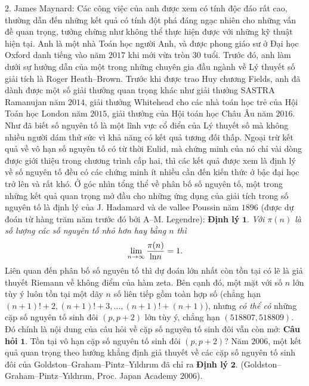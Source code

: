 \begin{multicols}{2}
	\vskip 0.1cm
	$2.$ James Maynard: Các công việc của anh được xem có tính độc đáo rất cao, thường dẫn đến những kết quả có tính đột phá đáng ngạc nhiên cho những vấn đề quan trọng, tưởng chừng như không thể thực hiện được với những kỹ thuật hiện tại.  
	\vskip 0.1cm
	Anh là một nhà Toán học người Anh, và được phong giáo sư ở Đại học Oxford danh tiếng vào năm $2017$ khi mới vừa tròn $30$ tuổi. Trước đó, anh làm dưới sự hướng dẫn của một trong những chuyên gia đầu ngành về Lý thuyết số giải tích là Roger Heath--Brown. Trước khi được trao Huy chương Fields, anh đã dành được một số giải thưởng quan trọng khác như giải thưởng SASTRA Ramanujan năm $2014$, giải thưởng Whitehead cho các nhà toán học trẻ của Hội Toán học London năm $2015$, giải thưởng của Hội toán học Châu Âu năm $2016$.    
	\vskip 0.1cm
	Như đã biết số nguyên tố là một lĩnh vực cổ điển của Lý thuyết số mà không nhiều người dám thử sức vì khả năng có kết quả tương đối thấp. Ngoại trừ kết quả về vô hạn số nguyên tố có từ thời Eulid, mà chứng minh của nó chỉ vài dòng được giới thiệu trong chương trình cấp hai, thì các kết quả được xem là định lý về số nguyên tố đều có các chứng minh ít nhiều cần đến kiến thức ở bậc đại học trở lên và rất khó. Ở góc nhìn tổng thể về phân bố số nguyên tố, một trong những kết quả quan trọng mở đầu cho những ứng dụng của giải tích trong số nguyên tố là định lý của J. Hadamard và de vallee Poussin năm $1896$ (được dự đoán từ hàng trăm năm trước đó bởi A--M. Legendre):
	\vskip 0.1cm
	\textbf{\color{duongvaotoanhoc}Định lý} $\pmb{1.}$ \textit{Với $\pi(n)$ là số lượng các số nguyên tố nhỏ hơn hay bằng $n$ thì} 
	\begin{align*}
		\lim_{n \to \infty} \frac{\pi(n)}{{\rm ln}n}=1.
	\end{align*}
	Liên quan đến phân bố số nguyên tố thì dự đoán lớn nhất còn tồn tại có lẽ là giả thuyết Riemann về không điểm của hàm zeta. Bên cạnh đó, một mặt với số $n$ lớn tùy ý luôn tồn tại một dãy $n$ số liên tiếp gồm toàn hợp số (chẳng hạn $(n+1)!+2, (n+1)!+3, \ldots, (n+1)!+(n+1)$), nhưng {\it có thể có} những cặp số nguyên tố sinh đôi $(p,p+2)$ lớn tùy ý, chẳng hạn $(518807,518809)$. Đó chính là nội dung của câu hỏi về cặp số nguyên tố sinh đôi vẫn còn mở: 
	\vskip 0.1cm
	\textbf{\color{duongvaotoanhoc}Câu hỏi} $\pmb{1.}$
		Tồn tại vô hạn cặp số nguyên tố sinh đôi $(p,p+2)$?
	\vskip 0.1cm
	Năm $2006$, một kết quả quan trọng theo hướng khẳng định giả thuyết về các cặp số nguyên tố sinh đôi của Goldston--Graham--Pintz--Yıldırım đã chỉ ra 
	\vskip 0.1cm
	\textbf{\color{duongvaotoanhoc}Định lý} $\pmb{2.}$ (Goldston--Graham--Pintz--Yıldırım, Proc. Japan Academy $2006$).

\end{multicols}
